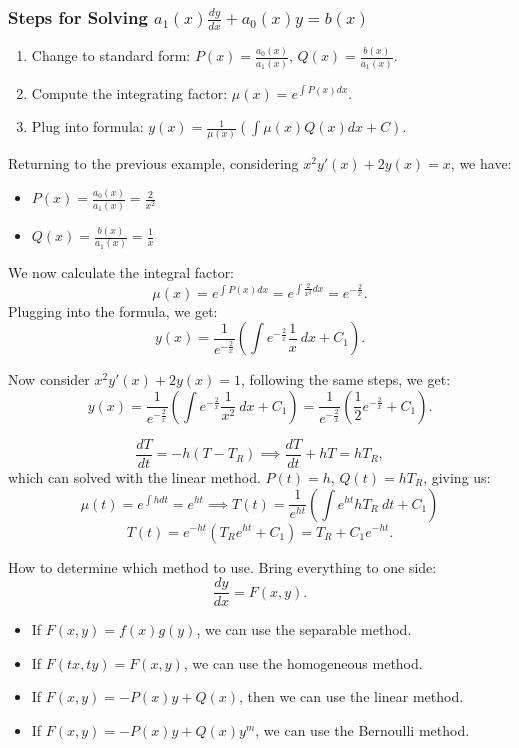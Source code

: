 \documentclass[../main/main.tex]{subfiles}
\begin{document}
\subsubsection{Steps for Solving $a_1(x)\frac{dy}{dx}+a_0(x)y=b(x)$}
\begin{enumerate}
	\item Change to standard form: $P(x) = \frac{a_0(x)}{a_1(x)}$, $Q(x)=\frac{b(x)}{a_1(x)}$.
	\item Compute the integrating factor: $\mu(x) = e^{\int P(x)dx}$.
	\item Plug into formula: $y(x) = \frac{1}{\mu(x) }\left( \int \mu(x)Q(x)dx+C \right)$.
\end{enumerate}
\begin{example}
	Returning to the previous example, considering $x^2 y'(x)+2y(x)=x$, we have:
	\begin{itemize}
		\item $P(x)= \frac{a_0(x)}{a_1(x)}=\frac{2}{x^2}$
		\item $Q(x)= \frac{b(x)}{a_1(x)}=\frac{1}{x}$
	\end{itemize}
	We now calculate the integral factor:  \[
		\mu(x) = e^{\int P(x) dx}=e^{\int \frac{2}{x^2}dx}=e^{-\frac{2}{x}}
	.\] Plugging into the formula, we get: \[
	y(x) = \frac{1}{e^{-\frac{2}{x}}}\left( \int e^{-\frac{2}{x}}\frac{1}{x}~dx + C_1 \right) 
	.\] 

\end{example}
\begin{example}
	Now consider $x^2y'(x)+2y(x)=1$, following the same steps, we get: \[
	y(x) = \frac{1}{e^{-\frac{2}{x}}}\left( \int e^{-\frac{2}{x}} \frac{1}{x^2}~dx + C_1 \right) = 
	\frac{1}{e^{-\frac{2}{x}}}\left( \frac{1}{2} e^{-\frac{2}{x}}+ C_1 \right) 
	.\] 
\end{example}
\begin{example}
	\[
		\frac{dT}{dt}=-h(T-T_R) \implies \frac{dT}{dt}+hT=hT_R
	,\]  which can solved with the linear method. $P(t) = h$,  $Q(t) = hT_R$, giving us:  \[
	\mu(t) = e^{\int h dt} = e^{ht} \implies T(t) = \frac{1}{e^{ht}}\left( \int e^{ht}hT_R~ dt +C_1 \right) 
	\]\[
	T(t) = e^{-ht}\left( T_R e^{ht}+C_1 \right) = T_R + C_1 e^{-ht} 
	.\]  

\end{example}
\begin{remark}
	How to determine which method to use. Bring everything to one side: \[
		\frac{dy}{dx}=F(x,y)
	.\] 
	\begin{itemize}
		\item If $F(x,y) = f(x)g(y)$, we can use the separable method.
		\item If  $F(tx,ty)=F(x,y)$, we can use the homogeneous method.
		\item If  $F(x,y)=-P(x)y+Q(x)$, then we can use the linear method.
		\item If  $F(x,y) = -P(x)y+Q(x)y^{m}$, we can use the Bernoulli method.
	\end{itemize}
\end{remark}
\end{document}
